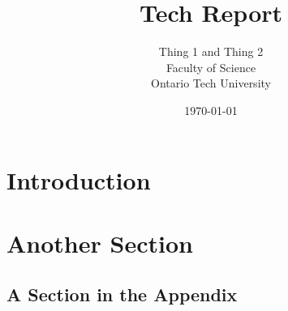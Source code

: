 \documentclass[12pt,letterpaper]{article}
\begin{document}
\title{Tech Report}

\author{Thing 1 and Thing 2\\
Faculty of Science\\
Ontario Tech University\\
}
\date{\today}

\maketitle




\begin{abstract}
  \lipsum[1]
\end{abstract}

\section{Introduction}
\lipsum[2-4]

\section{Another Section}
\lipsum[2-4]

\newpage
\begin{appendices}

\section{A Section in the Appendix}
\lipsum[2-5]

\end{appendices}
\newpage




\end{document}
